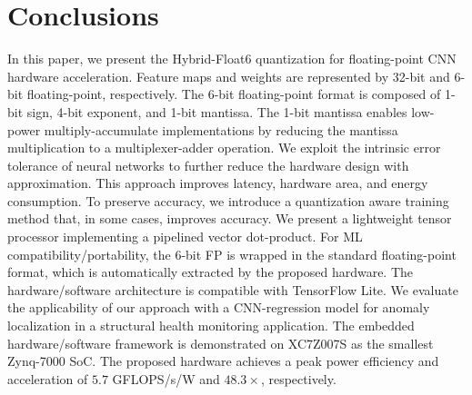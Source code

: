 \section{Conclusions}
\label{sec:conclusions}
In this paper, we present the Hybrid-Float6 quantization for floating-point CNN hardware acceleration. Feature maps and weights are represented by 32-bit and 6-bit floating-point, respectively. The 6-bit floating-point format is composed of 1-bit sign, 4-bit exponent, and 1-bit mantissa. The 1-bit mantissa enables low-power multiply-accumulate implementations by reducing the mantissa multiplication to a multiplexer-adder operation. We exploit the intrinsic error tolerance of neural networks to further reduce the hardware design with approximation. This approach improves latency, hardware area, and energy consumption. To preserve accuracy, we introduce a quantization aware training method that, in some cases, improves accuracy. We present a lightweight tensor processor implementing a pipelined vector dot-product. For ML compatibility/portability, the 6-bit FP is wrapped in the standard floating-point format, which is automatically extracted by the proposed hardware. The hardware/software architecture is compatible with TensorFlow Lite. We evaluate the applicability of our approach with a CNN-regression model for anomaly localization in a structural health monitoring application. The embedded hardware/software framework is demonstrated on XC7Z007S as the smallest Zynq-7000 SoC. The proposed hardware achieves a peak power efficiency and acceleration of $5.7$ GFLOPS/s/W and $48.3\times$, respectively.